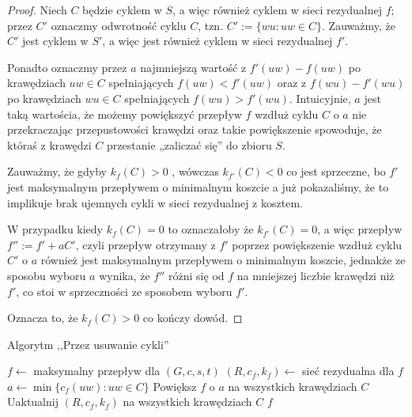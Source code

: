\begin{theorem}
\begin{proof}
		Niech $C$ będzie cyklem w $S$, a więc również 
		cyklem w sieci rezydualnej $f$; przez $C'$ oznaczmy
		odwrotność cyklu $C$, tzn. $C' := \{wu : uw \in C\}$.
		Zauważmy, że $C'$ jest cyklem w $S'$, a więc jest
		również cyklem w sieci rezydualnej $f'$. 
		
		Ponadto oznaczmy
		przez $a$ najmniejszą wartość z $f'(uw) - f(uw)$ po krawędziach
		$uw \in C$ spełniających $f(uw) < f'(uw)$ oraz z 
		$f(wu) - f'(wu)$ po krawędziach $wu \in C$ spełniających
		$f(wu) > f'(wu)$. Intuicyjnie, $a$ jest taką wartościa, 
		że
		możemy powiększyć przepływ $f$ wzdłuż cyklu $C$ o $a$ 
		nie przekraczając przepustowości krawędzi oraz 
		takie powiększenie
		spowoduje, że któraś z krawędzi $C$ przestanie 
		„zaliczać się” do zbioru $S$.
		
		Zauważmy, że gdyby $k_f(C) > 0$ , wówczas $k_{f'}(C) < 0$
		co jest sprzeczne, bo $f'$ jest maksymalnym
		przepływem o minimalnym koszcie a już pokazaliśmy,
		że to implikuje brak ujemnych cykli
		w sieci rezydualnej z kosztem.
		
		W przypadku kiedy $k_f(C) = 0$ to oznaczałoby że $k_{f'}(C)=0$,
		a więc przepływ $f'' := f' + aC'$, czyli przepływ otrzymany
		z $f'$ poprzez powiększenie wzdłuż cyklu $C'$ o $a$ również 
		jest maksymalnym przepływem o minimalnym koszcie, jednakże
		ze sposobu wyboru $a$ wynika, że $f''$ różni się od $f$
		na mniejszej liczbie krawędzi niż $f'$, co stoi w 
		sprzeczności ze sposobem wyboru $f'$.
		
		Oznacza to, że $k_f(C) > 0$ co kończy dowód.
		
	\end{proof}
	\label{mincost_maxflow_proof}
\end{theorem}

\begin{algorithm}[H]
	\caption{Algorytm ,,Przez usuwanie cykli''}
	\begin{algorithmic}[1]
		\State $f \gets $ maksymalny przepływ dla $(G,c,s,t)$
		\State $(R,c_f,k_f) \gets $ sieć rezydualna dla $f$
		\State $a \gets \min\{c_f(uw) : uw \in C\}$
		\State Powiększ $f$ o $a$ na wszystkich krawędziach $C$
		\State Uaktualnij $(R, c_f, k_f)$ na wszystkich krawędziach $C$
		\EndWhile 
		\State \Return $f$
		\EndProcedure
	\end{algorithmic}
	\label{zad45}
\end{algorithm}

